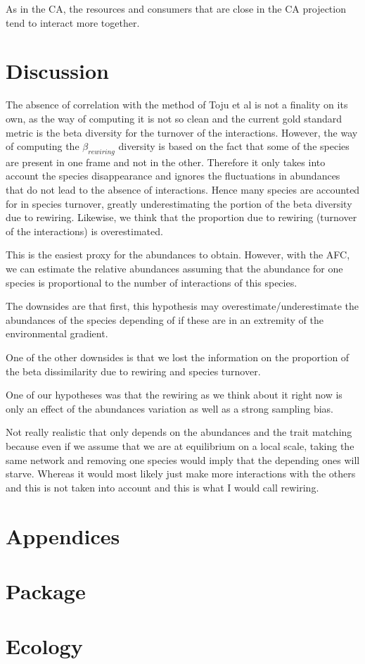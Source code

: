 \documentclass{article}
\begin{document}
As in the CA, the resources and consumers that are close in the CA projection tend to interact more together.

\section{Discussion}

The absence of correlation with the method of Toju et al is not a finality on its own, as the way of computing it is not so clean and the current gold standard metric is the beta diversity for the turnover of the interactions. However, the way of computing the $\beta_{rewiring}$ diversity is based on the fact that some of the species are present in one frame and not in the other. Therefore it only takes into account the species disappearance and ignores the fluctuations in abundances that do not lead to the absence of interactions. Hence many species are accounted for in species turnover, greatly underestimating the portion of the beta diversity due to rewiring. Likewise, we think that the proportion due to rewiring (turnover of the interactions) is overestimated.

This is the easiest proxy for the abundances to obtain. However, with the AFC, we can estimate the relative abundances assuming that the abundance for one species is proportional to the number of interactions of this species.

The downsides are that first, this hypothesis may overestimate/underestimate the abundances of the species depending of if these are in an extremity of the environmental gradient.

One of the other downsides is that we lost the information on the proportion of the beta dissimilarity due to rewiring and species turnover. 

One of our hypotheses was that the rewiring as we think about it right now is only an effect of the abundances variation as well as a strong sampling bias.


Not really realistic that only depends on the abundances and the trait matching because even if we assume that we are at equilibrium on a local scale, taking the same network and removing one species would imply that the depending ones will starve. Whereas it would most likely just make more interactions with the others and this is not taken into account and this is what I would call rewiring.


\section{Appendices}



\section{Package}



\section{Ecology}
\end{document}
